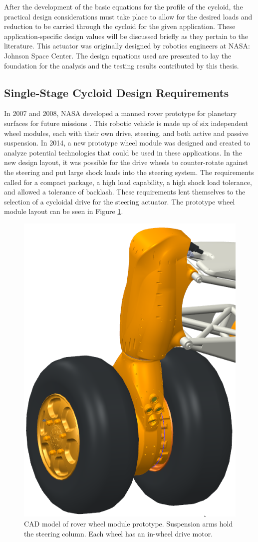 After the development of the basic equations for the profile of the cycloid, the practical design considerations must take place to allow for the desired loads and reduction to be carried through the cycloid for the given application. These application-specific design values will be discussed briefly as they pertain to the literature. This actuator was originally designed by robotics engineers at NASA: Johnson Space Center. The design equations used are presented to lay the foundation for the analysis and the testing results contributed by this thesis.

\subsection{Single-Stage Cycloid Design Requirements}

In 2007 and 2008, NASA developed a manned rover prototype for planetary surfaces for future missions \cite{ref:rover}.
This robotic vehicle is made up of six independent wheel modules, each with their own drive, steering, and both active and passive suspension.
In 2014, a new prototype wheel module was designed and created to analyze potential technologies that could be used in these applications.
In the new design layout, it was possible for the drive wheels to counter-rotate against the steering and put large shock loads into the steering system.
The requirements called for a compact package, a high load capability, a high shock load tolerance, and allowed a tolerance of backlash. These requirements lent themselves to the selection of a cycloidal drive for the steering actuator.
The prototype wheel module layout can be seen in Figure \ref{fig:wheel_module}.

\begin{figure}[!b]
   \centering
   \includegraphics[width=0.40\linewidth]{fig/wheel_module_CAD}
   \caption{CAD model of rover wheel module prototype.
   Suspension arms hold the steering column.
   Each wheel has an in-wheel drive motor.}
   \label{fig:wheel_module}
\end{figure}

